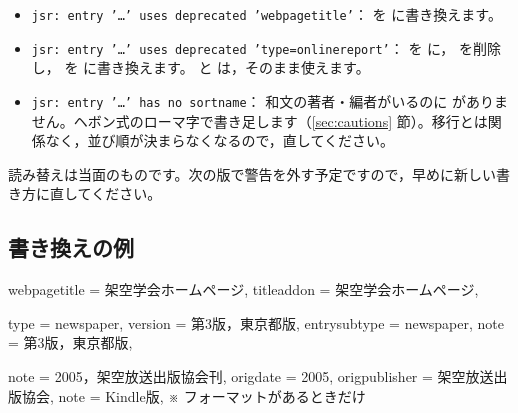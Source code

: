 \begin{itemize}
\item \texttt{jsr: entry '…' uses deprecated 'webpagetitle'}：
 を  に書き換えます。
\item \texttt{jsr: entry '…' uses deprecated 'type=onlinereport'}：
 を  に， を削除し， を  に書き換えます。 と  は，そのまま使えます。
\item \texttt{jsr: entry '…' has no sortname}：
和文の著者・編者がいるのに  がありません。ヘボン式のローマ字で書き足します（\ref{sec:cautions} 節）。移行とは関係なく，並び順が決まらなくなるので，直してください。
\end{itemize}

読み替えは当面のものです。次の版で警告を外す予定ですので，早めに新しい書き方に直してください。

\subsection{書き換えの例}
\par\nopagebreak
\begin{bibtemplate}
webpagetitle = {架空学会ホームページ},
titleaddon   = {架空学会ホームページ},
\end{bibtemplate}

\par\nopagebreak
\begin{bibtemplate}
type    = {newspaper},
version = {第3版，東京都版},
entrysubtype = {newspaper},
note         = {第3版，東京都版},
\end{bibtemplate}

\par\nopagebreak
\begin{bibtemplate}
note          = {2005，架空放送出版協会刊},
origdate      = {2005},
origpublisher = {架空放送出版協会},
note          = {Kindle版},     ※ フォーマットがあるときだけ
\end{bibtemplate}
